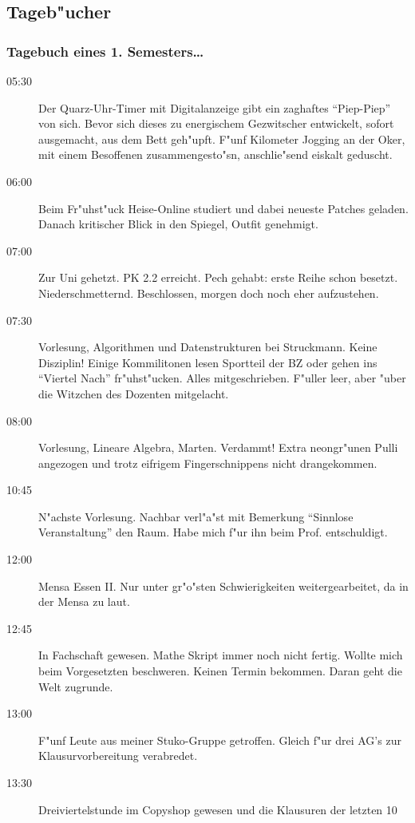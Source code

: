 \subsection{Tageb"ucher}
\subsubsection{Tagebuch eines 1. Semesters\ldots}

\begin{description}
\item[05:30] Der Quarz-Uhr-Timer mit Digitalanzeige gibt ein zaghaftes "`Piep-Piep"'
von sich. Bevor sich dieses zu energischem Gezwitscher entwickelt, sofort
ausgemacht, aus dem Bett geh"upft. F"unf Kilometer Jogging an der Oker,
mit einem Besoffenen zusammengesto"sn, anschlie"send eiskalt geduscht.
\item[06:00] Beim Fr"uhst"uck Heise-Online studiert und dabei neueste Patches geladen.
Danach kritischer Blick in den Spiegel, Outfit genehmigt.
\item[07:00] Zur Uni gehetzt. PK 2.2 erreicht. Pech gehabt: erste Reihe schon besetzt.
Niederschmetternd. Beschlossen, morgen doch noch eher aufzustehen.
\item[07:30] Vorlesung, Algorithmen und Datenstrukturen bei Struckmann. Keine Disziplin!
Einige Kommilitonen lesen
Sportteil der BZ oder gehen ins "`Viertel Nach"' fr"uhst"ucken. Alles
mitgeschrieben. F"uller leer, aber "uber die Witzchen des Dozenten mitgelacht.
\item[08:00] Vorlesung, Lineare Algebra, Marten. Verdammt! Extra neongr"unen Pulli
angezogen und trotz eifrigem Fingerschnippens nicht drangekommen.
\item[10:45] N"achste Vorlesung. Nachbar verl"a"st mit Bemerkung "`Sinnlose
Veranstaltung"' den Raum. Habe mich f"ur ihn beim Prof. entschuldigt.
\item[12:00] Mensa Essen II. Nur unter gr"o"sten Schwierigkeiten
weitergearbeitet, da in der Mensa zu laut.
\item[12:45] In Fachschaft gewesen. Mathe Skript immer noch nicht fertig. Wollte
mich beim Vorgesetzten beschweren. Keinen Termin bekommen. Daran geht die
Welt zugrunde.
\item[13:00] F"unf Leute aus meiner Stuko-Gruppe getroffen. Gleich f"ur drei AG's zur
Klausurvorbereitung verabredet.
\item[13:30] Dreiviertelstunde im Copyshop gewesen und die Klausuren der letzten 10

\end{description}
